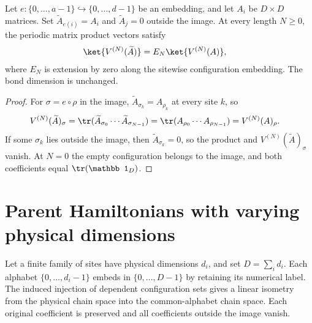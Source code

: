 \begin{lemma}
    \label{lem:mpv_state_extend_physical}
    \leanok
    Let $e:\{0,\ldots,a-1\}\hookrightarrow\{0,\ldots,d-1\}$ be an embedding,
    and let $A_i$ be $D\times D$ matrices. Set $\widetilde A_{e(i)}=A_i$
    and $\widetilde A_j=0$ outside the image. At every length $N\ge0$,
    the periodic matrix product vectors satisfy
    \begin{align}
        \ket{V^{(N)}(\widetilde A)} & =E_N\ket{V^{(N)}(A)},
    \end{align}
    where $E_N$ is extension by zero along the sitewise configuration
    embedding. The bond dimension is unchanged.
\end{lemma}
\begin{proof}
    \leanok
    For $\sigma=e\circ\rho$ in the image, $\widetilde A_{\sigma_k}=A_{\rho_k}$
    at every site $k$, so
    \begin{align}
        V^{(N)}(\widetilde A)_\sigma
         & =\tr(\widetilde A_{\sigma_0}\cdots\widetilde A_{\sigma_{N-1}})
        =\tr(A_{\rho_0}\cdots A_{\rho_{N-1}})=V^{(N)}(A)_\rho.
    \end{align}
    If some $\sigma_k$ lies outside the image, then
    $\widetilde A_{\sigma_k}=0$, so the product and
    $V^{(N)}(\widetilde A)_\sigma$ vanish. At $N=0$ the empty
    configuration belongs to the image, and both coefficients equal
    $\tr(\mathbb 1_D)$.
\end{proof}

\section{Parent Hamiltonians with varying physical dimensions}

\begin{definition}
    \label{def:varying_physical_common_alphabet}
    \leanok
    Let a finite family of sites have physical dimensions $d_i$, and set
    $D=\sum_i d_i$. Each alphabet $\{0,\ldots,d_i-1\}$ embeds in
    $\{0,\ldots,D-1\}$ by retaining its numerical label. The induced injection
    of dependent configuration sets gives a linear isometry from
    the physical chain space into the common-alphabet chain space.
    Each original coefficient is preserved and all coefficients outside
    the image vanish.
\end{definition}

